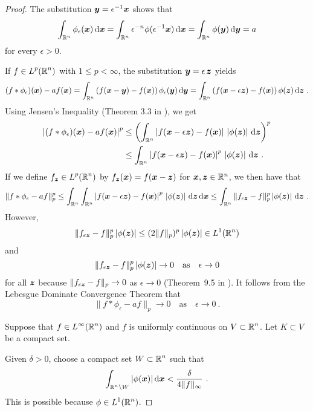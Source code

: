 \begin{proof}
The substitution ${\bm{y}} = \epsilon^{-1} {\bm{x}}$ shows that
\[
\int_{\mathbb{R}^n} \phi_\epsilon({\bm{x}}) \,\mathrm{d}{{\bm{x}}} 
= \int_{\mathbb{R}^n} \epsilon^{-n} \phi(\epsilon^{-1} {\bm{x}}) \,\mathrm{d}{{\bm{x}}} 
= \int_{\mathbb{R}^n} \phi({\bm{y}}) \,\mathrm{d}{{\bm{y}}} = a
\]
for every $\epsilon >0$.

 If $\displaystyle f\in L^p(\mathbb{R}^n)$ with $1\leq p < \infty$,
the substitution ${\bm{y}} = \epsilon\, {\bm{z}}$ yields
\[
(f\ast \phi_\epsilon)({\bm{x}}) - a f({\bm{x}}) =
\int_{\mathbb{R}^n} \left( f({\bm{x}}-{\bm{y}}) - f({\bm{x}})
\right)\phi_\epsilon({\bm{y}}) \,\mathrm{d}{{\bm{y}}}
= \int_{\mathbb{R}^n} \left( f({\bm{x}}-\epsilon {\bm{z}}) - f({\bm{x}})
\right)\phi({\bm{z}}) \,\mathrm{d}{{\bm{z}}} \ .
\]
Using Jensen's Inequality (Theorem 3.3 in \cite{Ru}), we get
\begin{align*}
\left| (f\ast \phi_\epsilon)({\bm{x}}) - a f({\bm{x}}) \right|^p
&\leq \left( \int_{\mathbb{R}^n} \left| f({\bm{x}}-\epsilon {\bm{z}}) - f({\bm{x}})
\right| \,\left| \phi({\bm{z}})\right| \,\mathrm{d}{{\bm{z}}} \right)^p \\
&\leq \int_{\mathbb{R}^n} \left| f({\bm{x}}-\epsilon{\bm{z}}) - f({\bm{x}})
\right|^p \,\left| \phi({\bm{z}})\right| \,\mathrm{d}{{\bm{z}}} \ .
\end{align*}
If we define $\displaystyle f_{{\bm{z}}} \in L^p(\mathbb{R}^n)$ by
$f_{{\bm{z}}}({\bm{x}}) = f({\bm{x}}-{\bm{z}})$ for
${\bm{x}}, {\bm{z}}\in \mathbb{R}^n$, we then have that
\[
\| f\ast \phi_\epsilon -a f \|_p^p
\leq \int_{\mathbb{R}^n} \int_{\mathbb{R}^n} \left| f({\bm{x}}-\epsilon {\bm{z}})
 - f({\bm{x}})\right|^p\, \left| \phi({\bm{z}})\right| \,\mathrm{d}{{\bm{z}}}
\,\mathrm{d}{{\bm{x}}}
\leq \int_{\mathbb{R}^n} \| f_{\epsilon{\bm{z}}} - f \|_p^p
\left|\phi({\bm{z}})\right|
\,\mathrm{d}{{\bm{z}}} \ .
\]
However,
\[
\| f_{\epsilon{\bm{z}}} - f \|_p^p \left|\phi({\bm{z}})\right| \leq
(2 \|f\|_p)^p \left|\phi({\bm{z}})\right| \in L^1(\mathbb{R}^n)
\]
and
\[
\| f_{\epsilon{\bm{z}}} - f \|_p^p \left|\phi({\bm{z}})\right| \rightarrow 0
\quad \text{as} \quad \epsilon \rightarrow 0
\]
for all ${\bm{z}}$ because
$\displaystyle \| f_{\epsilon{\bm{z}}} - f \|_p \rightarrow 0$
as $\epsilon \rightarrow 0$ (Theorem~9.5 in \cite{Ru}).  It follows from the
Lebesgue Dominate Convergence Theorem that
\[
\| f\ast \phi_\epsilon -a f \|_p \rightarrow 0 \quad \text{as} \quad
\epsilon \rightarrow 0 \ .
\]

 Suppose that $\displaystyle f \in L^\infty(\mathbb{R}^n)$ and $f$
is uniformly continuous on $\displaystyle V\subset \mathbb{R}^n$.
Let $K \subset V$ be a compact set.

Given $\delta >0$, choose a compact set
$\displaystyle W \subset \mathbb{R}^n$ such that
\[
\int_{\mathbb{R}^n\setminus W} |\phi({\bm{x}})| \,\mathrm{d}{{\bm{x}}} <
\frac{\delta}{4\|f\|_\infty} \ .
\]
This is possible because $\displaystyle \phi \in L^1(\mathbb{R}^n)$.


\end{proof}

